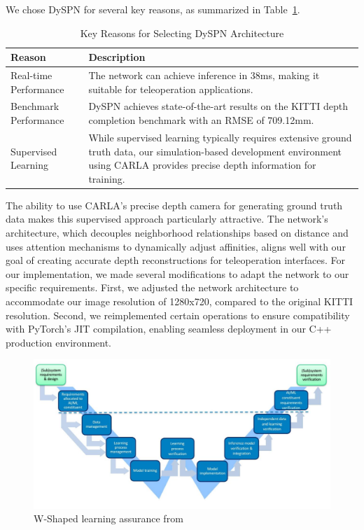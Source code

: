 We chose \ac{DySPN} for several key reasons, as summarized in Table~\ref{table:dyspn_reasons}.

\begin{table}[h!]
\centering
\begin{tabular}{@{}p{4.5cm}p{9.3cm}@{}}
\toprule
\textbf{Reason} & \textbf{Description} \\
\midrule
Real-time Performance & The network can achieve inference in 38ms, making it suitable for teleoperation applications. \\
\midrule
Benchmark Performance & \ac{DySPN} achieves state-of-the-art results on the KITTI depth completion benchmark with an RMSE of 709.12mm. \\
\midrule
Supervised Learning  & While supervised learning typically requires extensive ground truth data, our simulation-based development environment using CARLA provides precise depth information for training. \\
\bottomrule
\end{tabular}
\caption{Key Reasons for Selecting \ac{DySPN} Architecture}
\label{table:dyspn_reasons}
\end{table}

The ability to use CARLA's precise depth camera for generating ground truth data makes this supervised approach particularly attractive. The network's architecture, which decouples neighborhood relationships based on distance and uses attention mechanisms to dynamically adjust affinities, aligns well with our goal of creating accurate depth reconstructions for teleoperation interfaces.
For our implementation, we made several modifications to adapt the network to our specific requirements. First, we adjusted the network architecture to accommodate our image resolution of 1280x720, compared to the original KITTI resolution. Second, we reimplemented certain operations to ensure compatibility with PyTorch's JIT compilation, enabling seamless deployment in our C++ production environment.

\begin{figure}
    \centering
    \includegraphics[width=\textwidth]{figures/wshaped.png}
    \caption{W-Shaped learning assurance from \cite{easa2024}}
    \label{fig:wshaped_learning}
\end{figure}

